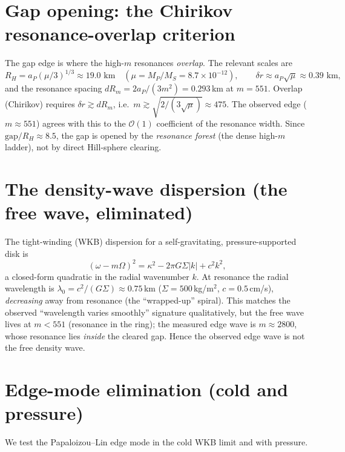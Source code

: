 \documentclass[11pt]{article}
\theoremstyle{remark}
\begin{document}
\section{Gap opening: the Chirikov resonance-overlap criterion}\label{sec:chirikov}

The gap edge is where the high-$m$ resonances \emph{overlap}.  The relevant
scales are
\begin{equation}\label{eq:scales}
R_H=a_P(\mu/3)^{1/3}\approx19.0\text{ km}
\quad(\mu=M_P/M_S=8.7\times10^{-12}),\qquad
\delta r\approx a_P\sqrt\mu\approx0.39\text{ km},
\end{equation}
and the resonance spacing $dR_m=2a_P/(3m^2)=0.293$\,km at $m=551$.  Overlap
(Chirikov) requires $\delta r\gtrsim dR_m$, i.e.\
$m\gtrsim\sqrt{2/(3\sqrt\mu)}\approx475$.  The observed edge ($m\approx551$)
agrees with this to the $\mathcal O(1)$ coefficient of the resonance width.
Since $\mathrm{gap}/R_H\approx8.5$, the gap is opened by the \emph{resonance
forest} (the dense high-$m$ ladder), not by direct Hill-sphere clearing.

\section{The density-wave dispersion (the free wave, eliminated)}
\label{sec:dispersion}

The tight-winding (WKB) dispersion for a self-gravitating, pressure-supported
disk is
\begin{equation}\label{eq:dispersion}
(\omega-m\Omega)^2=\kappa^2-2\pi G\Sigma|k|+c^2k^2,
\end{equation}
a closed-form quadratic in the radial wavenumber $k$.  At resonance the radial
wavelength is $\lambda_0=c^2/(G\Sigma)\approx0.75$\,km
($\Sigma=500$\,kg/m$^2$, $c=0.5$\,cm/s), \emph{decreasing} away from resonance
(the ``wrapped-up'' spiral).  This matches the observed ``wavelength varies
smoothly'' signature qualitatively, but the free wave lives at $m<551$
(resonance in the ring); the measured edge wave is $m\approx2800$, whose
resonance lies \emph{inside} the cleared gap.  Hence the observed edge wave is
not the free density wave.

\section{Edge-mode elimination (cold and pressure)}\label{sec:edgemode}

We test the Papaloizou--Lin edge mode in the cold WKB limit and with pressure.
\end{document}

